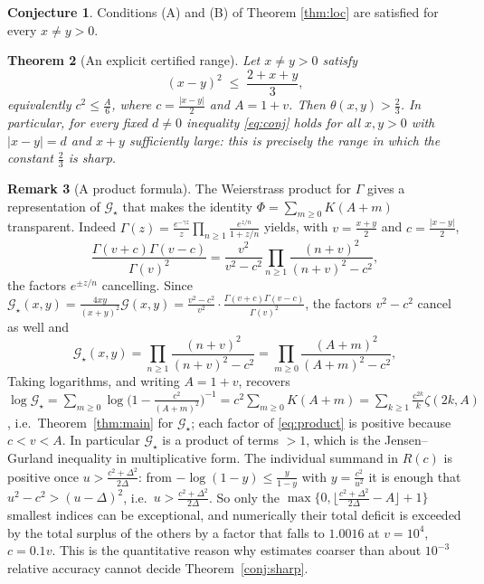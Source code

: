 \documentclass[11pt,a4paper]{amsart}
\newtheorem{theorem}{Theorem}[section]
\theoremstyle{definition}
\newtheorem{conjecture}[theorem]{Conjecture}
\newtheorem{remark}[theorem]{Remark}
\newcommand{\Gg}{\mathcal{G}}
\newcommand{\Gs}{\mathcal{G}_{\star}}
\begin{document}
\begin{conjecture}\label{conj:ab}
Conditions (A) and (B) of Theorem \ref{thm:loc} are satisfied for every $x\ne y>0$.
\end{conjecture}

\begin{theorem}[An explicit certified range]\label{thm:partial}
Let $x\ne y>0$ satisfy
\begin{equation}\label{eq:partialcond}
  (x-y)^{2}\;\le\;\frac{2+x+y}{3},
\end{equation}
equivalently $c^{2}\le\frac A6$, where $c=\frac{|x-y|}{2}$ and $A=1+v$. Then
$\theta(x,y)>\frac23$. In particular, for every fixed $d\ne0$ inequality \eqref{eq:conj}
holds for all $x,y>0$ with $|x-y|=d$ and $x+y$ sufficiently large: this is precisely the
range in which the constant $\frac23$ is sharp.
\end{theorem}

\begin{remark}[A product formula]\label{rem:product}
The Weierstrass product for $\Gamma$ gives a representation of $\Gs$ that makes the
identity $\Phi=\sum_{m\ge0}K(A+m)$ transparent. Indeed
$\Gamma(z)=\frac{e^{-\gamma z}}{z}\prod_{n\ge1}\frac{e^{z/n}}{1+z/n}$ yields, with
$v=\frac{x+y}{2}$ and $c=\frac{|x-y|}{2}$,
\[
  \frac{\Gamma(v+c)\Gamma(v-c)}{\Gamma(v)^{2}}
   =\frac{v^{2}}{v^{2}-c^{2}}\prod_{n\ge1}\frac{(n+v)^{2}}{(n+v)^{2}-c^{2}} ,
\]
the factors $e^{\pm z/n}$ cancelling. Since
$\Gs(x,y)=\frac{4xy}{(x+y)^{2}}\Gg(x,y)=\frac{v^{2}-c^{2}}{v^{2}}\cdot
 \frac{\Gamma(v+c)\Gamma(v-c)}{\Gamma(v)^{2}}$, the factors $v^{2}-c^{2}$ cancel as well
and
\begin{equation}\label{eq:product}
  \Gs(x,y)=\prod_{n\ge1}\frac{(n+v)^{2}}{(n+v)^{2}-c^{2}}
          =\prod_{m\ge0}\frac{(A+m)^{2}}{(A+m)^{2}-c^{2}} ,
\end{equation}
Taking logarithms, and writing $A=1+v$, recovers $\log\Gs=\sum_{m\ge0}\log\big(1-\frac{c^{2}}{(A+m)^{2}}\big)^{-1}
=c^{2}\sum_{m\ge0}K(A+m)=\sum_{k\ge1}\frac{c^{2k}}{k}\zeta(2k,A)$, i.e.\
Theorem~\ref{thm:main} for $\Gs$; each factor of \eqref{eq:product} is positive because
$c<v<A$. In particular $\Gs$ is a product of terms $>1$, which is the Jensen--Gurland
inequality in multiplicative form. The individual summand in $R(c)$ is positive once
$u>\frac{c^{2}+\Delta^{2}}{2\Delta}$: from $-\log(1-y)\le\frac{y}{1-y}$ with
$y=\frac{c^{2}}{u^{2}}$ it is enough that $u^{2}-c^{2}>(u-\Delta)^{2}$, i.e.\
$u>\frac{c^{2}+\Delta^{2}}{2\Delta}$. So only the
$\max\big\{0,\lfloor\frac{c^{2}+\Delta^{2}}{2\Delta}-A\rfloor+1\big\}$ smallest indices can be
exceptional, and
numerically their total deficit is exceeded by the total surplus of the others by a factor
that falls to $1.0016$ at $v=10^{4}$, $c=0.1v$. This is the quantitative reason why
estimates coarser than about $10^{-3}$ relative accuracy cannot decide
Theorem~\ref{conj:sharp}.
\end{remark}
\end{document}
